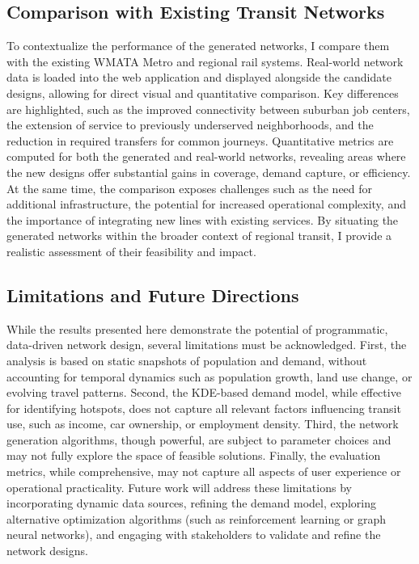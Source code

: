 \documentclass[manuscript,nonacm]{acmart}
\begin{document}
\subsection{Comparison with Existing Transit Networks}
To contextualize the performance of the generated networks, I compare them with the existing WMATA Metro and regional rail systems. Real-world network data is loaded into the web application and displayed alongside the candidate designs, allowing for direct visual and quantitative comparison. Key differences are highlighted, such as the improved connectivity between suburban job centers, the extension of service to previously underserved neighborhoods, and the reduction in required transfers for common journeys. Quantitative metrics are computed for both the generated and real-world networks, revealing areas where the new designs offer substantial gains in coverage, demand capture, or efficiency. At the same time, the comparison exposes challenges such as the need for additional infrastructure, the potential for increased operational complexity, and the importance of integrating new lines with existing services. By situating the generated networks within the broader context of regional transit, I provide a realistic assessment of their feasibility and impact.

\subsection{Limitations and Future Directions}
While the results presented here demonstrate the potential of programmatic, data-driven network design, several limitations must be acknowledged. First, the analysis is based on static snapshots of population and demand, without accounting for temporal dynamics such as population growth, land use change, or evolving travel patterns. Second, the KDE-based demand model, while effective for identifying hotspots, does not capture all relevant factors influencing transit use, such as income, car ownership, or employment density. Third, the network generation algorithms, though powerful, are subject to parameter choices and may not fully explore the space of feasible solutions. Finally, the evaluation metrics, while comprehensive, may not capture all aspects of user experience or operational practicality. Future work will address these limitations by incorporating dynamic data sources, refining the demand model, exploring alternative optimization algorithms (such as reinforcement learning or graph neural networks), and engaging with stakeholders to validate and refine the network designs.
\end{document}

